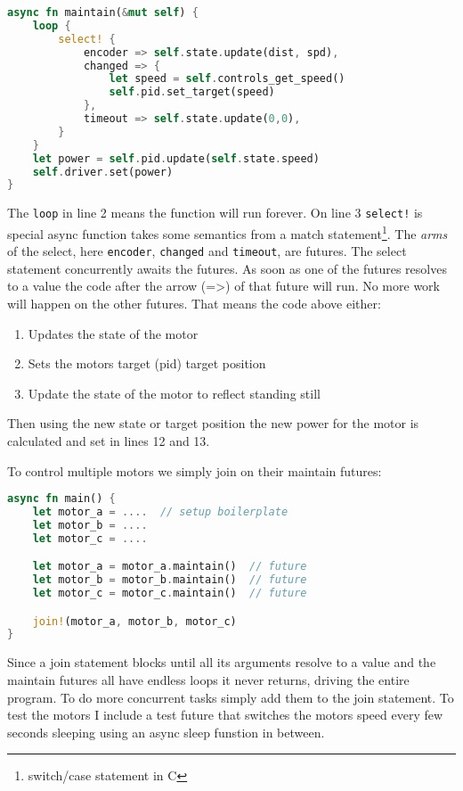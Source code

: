 \documentclass[lang=en, hanging-titles=true]{skrapport}
\begin{document}
\begin{minipage}{\linewidth} %
\begin{lstlisting}[language=rust, style=boxed, tabsize=2]
async fn maintain(&mut self) {
	loop {
		select! {
			encoder => self.state.update(dist, spd),
			changed => {
				let speed = self.controls_get_speed()
				self.pid.set_target(speed)
			},
			timeout => self.state.update(0,0),
		}
	}
	let power = self.pid.update(self.state.speed)
	self.driver.set(power)
}
\end{lstlisting}
\end{minipage}

The \texttt{loop} in line 2 means the function will run forever. On line 3 \texttt{select!} is special async function takes some semantics from a match statement\footnote{switch/case statement in C}. The \textit{arms} of the select, here \texttt{encoder}, \texttt{changed} and \texttt{timeout}, are futures. The select statement concurrently awaits the futures. As soon as one of the futures resolves to a value the code after the arrow (=>) of that future will run. No more work will happen on the other futures. That means the code above either:
\begin{enumerate}
	\item Updates the state of the motor
	\item Sets the motors target (pid) target position
	\item Update the state of the motor to reflect standing still
\end{enumerate}
Then using the new state or target position the new power for the motor is calculated and set in lines 12 and 13.

To control multiple motors we simply join on their maintain futures: 

\begin{minipage}{\linewidth} %
\begin{lstlisting}[language=rust, style=boxed, tabsize=2]
async fn main() {
	let motor_a = ....  // setup boilerplate
	let motor_b = ....
	let motor_c = ....

	let motor_a = motor_a.maintain()  // future
	let motor_b = motor_b.maintain()  // future
	let motor_c = motor_c.maintain()  // future

	join!(motor_a, motor_b, motor_c)
}
\end{lstlisting}
\end{minipage}

Since a join statement blocks until all its arguments resolve to a value and the maintain futures all have endless loops it never returns, driving the entire program. To do more concurrent tasks simply add them to the join statement. To test the motors I include a test future that switches the motors speed every few seconds sleeping using an async sleep funstion in between.
\end{document}
